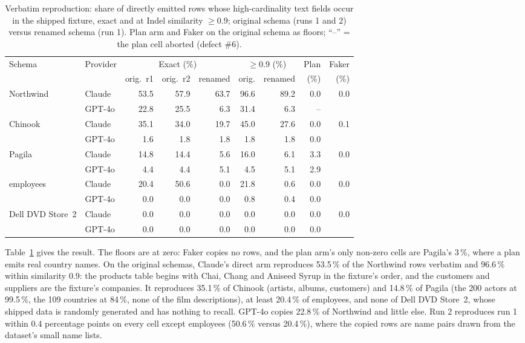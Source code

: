 \documentclass[preprint,12pt]{elsarticle}
\begin{document}
\begin{table}[t]
\centering\small
\caption{Verbatim reproduction: share of directly emitted rows whose high-cardinality text fields occur in the shipped fixture, exact and at Indel similarity $\geq 0.9$; original schema (runs 1 and 2) versus renamed schema (run 1). Plan arm and Faker on the original schema as floors; ``--'' = the plan cell aborted (defect \#6).}
\label{tab:copy}
\begin{tabular}{llrrrrrrr}
\toprule
Schema & Provider & \multicolumn{3}{c}{Exact (\%)} & \multicolumn{2}{c}{$\geq$0.9 (\%)} & Plan & Faker \\
\cmidrule(lr){3-5}\cmidrule(lr){6-7}
 & & orig.\ r1 & orig.\ r2 & renamed & orig. & renamed & (\%) & (\%) \\
\midrule
Northwind & Claude & 53.5 & 57.9 & 63.7 & 96.6 & 89.2 & 0.0 & 0.0 \\
 & GPT-4o & 22.8 & 25.5 & 6.3 & 31.4 & 6.3 & -- &  \\
Chinook & Claude & 35.1 & 34.0 & 19.7 & 45.0 & 27.6 & 0.0 & 0.1 \\
 & GPT-4o & 1.6 & 1.8 & 1.8 & 1.8 & 1.8 & 0.0 &  \\
Pagila & Claude & 14.8 & 14.4 & 5.6 & 16.0 & 6.1 & 3.3 & 0.0 \\
 & GPT-4o & 4.4 & 4.4 & 5.1 & 4.5 & 5.1 & 2.9 &  \\
employees & Claude & 20.4 & 50.6 & 0.0 & 21.8 & 0.6 & 0.0 & 0.0 \\
 & GPT-4o & 0.0 & 0.0 & 0.0 & 0.8 & 0.4 & 0.0 &  \\
Dell DVD Store~2 & Claude & 0.0 & 0.0 & 0.0 & 0.0 & 0.0 & 0.0 & 0.0 \\
 & GPT-4o & 0.0 & 0.0 & 0.0 & 0.0 & 0.0 & 0.0 &  \\
\bottomrule
\end{tabular}
\end{table}

Table~\ref{tab:copy} gives the result. The floors are at zero: Faker copies no rows, and the plan arm's only non-zero cells are Pagila's 3\,\%, where a plan emits real country names. On the original schemas, Claude's direct arm reproduces 53.5\,\% of the Northwind rows verbatim and 96.6\,\% within similarity 0.9: the products table begins with Chai, Chang and Aniseed Syrup in the fixture's order, and the customers and suppliers are the fixture's companies. It reproduces 35.1\,\% of Chinook (artists, albums, customers) and 14.8\,\% of Pagila (the 200 actors at 99.5\,\%, the 109 countries at 84\,\%, none of the film descriptions), at least 20.4\,\% of employees, and none of Dell DVD Store~2, whose shipped data is randomly generated and has nothing to recall. GPT-4o copies 22.8\,\% of Northwind and little else. Run 2 reproduces run 1 within 0.4 percentage points on every cell except employees (50.6\,\% versus 20.4\,\%), where the copied rows are name pairs drawn from the dataset's small name lists.
\end{document}
